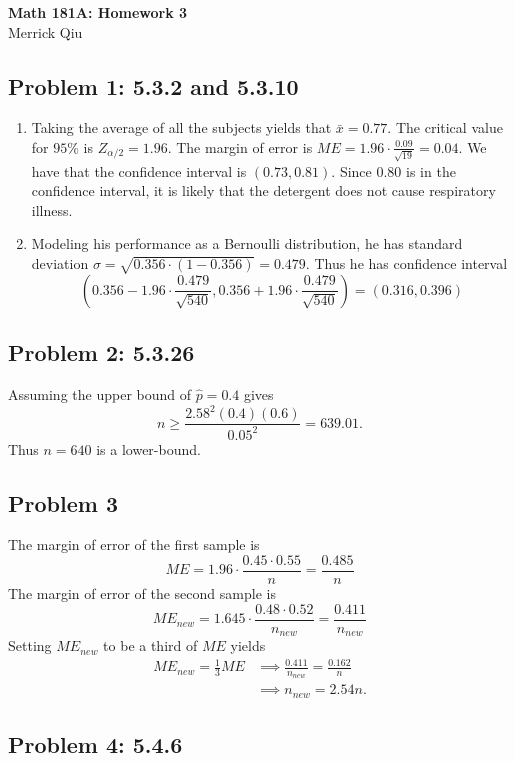 \documentclass{article}
\begin{document}
\begin{center}
	\huge{\bf Math 181A: Homework 3} \\
	Merrick Qiu 
\end{center}

\subsection*{Problem 1: 5.3.2 and 5.3.10}
\begin{enumerate}
	\item Taking the average of all the subjects yields that $\bar{x} = 0.77$. 
	The critical value for $95\%$ is $Z_{\alpha/2} = 1.96$.
	The margin of error is $ME = 1.96\cdot\frac{0.09}{\sqrt{19}} = 0.04$.
	We have that the confidence interval is $(0.73, 0.81)$.
	Since $0.80$ is in the confidence interval, 
	it is likely that the detergent does not cause respiratory illness.
	\item Modeling his performance as a Bernoulli distribution,
	he has standard deviation $\sigma = \sqrt{0.356\cdot(1-0.356)} = 0.479$.
	Thus he has confidence interval
	\[
		(0.356-1.96\cdot\frac{ 0.479}{\sqrt{540}}, 0.356+1.96\cdot\frac{ 0.479}{\sqrt{540}})
		= (0.316, 0.396)
	\]
\end{enumerate}
\newpage

\subsection*{Problem 2: 5.3.26}
Assuming the upper bound of $\hat{p} = 0.4$ gives
\[
	n \geq \frac{2.58^2(0.4)(0.6)}{0.05^2} = 639.01.
\]
Thus $n=640$ is a lower-bound.
\newpage

\subsection*{Problem 3}
The margin of error of the first sample is 
\[
	ME = 1.96\cdot\frac{0.45\cdot0.55}{n} = \frac{0.485}{n}
\]
The margin of error of the second sample is
\[
	ME_{new} = 1.645\cdot\frac{0.48\cdot0.52}{n_{new}} = \frac{0.411}{n_{new}}
\]
Setting $ME_{new}$ to be a third of $ME$ yields 
\begin{align*}
	ME_{new} = \frac{1}{3}ME 
	&\implies \frac{0.411}{n_{new}} = \frac{0.162}{n} \\
	&\implies n_{new} = 2.54n.
\end{align*}
\newpage

\subsection*{Problem 4: 5.4.6}
\end{document}
